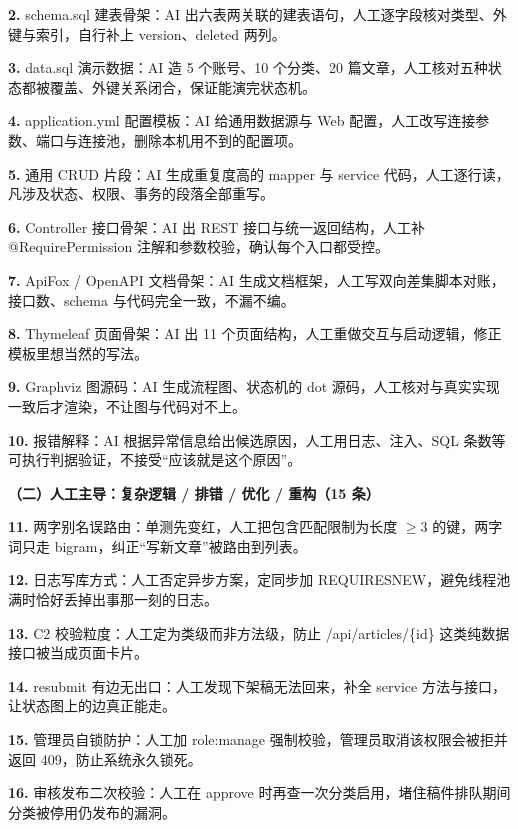 \documentclass[zihao=-4,UTF8,openany]{ctexart}
\renewcommand{\_}{\textunderscore\allowbreak}
\begin{document}
\noindent\textbf{2.} schema.sql 建表骨架：AI 出六表两关联的建表语句，人工逐字段核对类型、外键与索引，自行补上 version、deleted 两列。

\noindent\textbf{3.} data.sql 演示数据：AI 造 5 个账号、10 个分类、20 篇文章，人工核对五种状态都被覆盖、外键关系闭合，保证能演完状态机。

\noindent\textbf{4.} application.yml 配置模板：AI 给通用数据源与 Web 配置，人工改写连接参数、端口与连接池，删除本机用不到的配置项。

\noindent\textbf{5.} 通用 CRUD 片段：AI 生成重复度高的 mapper 与 service 代码，人工逐行读，凡涉及状态、权限、事务的段落全部重写。

\noindent\textbf{6.} Controller 接口骨架：AI 出 REST 接口与统一返回结构，人工补 @RequirePermission 注解和参数校验，确认每个入口都受控。

\noindent\textbf{7.} ApiFox / OpenAPI 文档骨架：AI 生成文档框架，人工写双向差集脚本对账，接口数、schema 与代码完全一致，不漏不编。

\noindent\textbf{8.} Thymeleaf 页面骨架：AI 出 11 个页面结构，人工重做交互与启动逻辑，修正模板里想当然的写法。

\noindent\textbf{9.} Graphviz 图源码：AI 生成流程图、状态机的 dot 源码，人工核对与真实实现一致后才渲染，不让图与代码对不上。

\noindent\textbf{10.} 报错解释：AI 根据异常信息给出候选原因，人工用日志、注入、SQL 条数等可执行判据验证，不接受“应该就是这个原因”。

\noindent\textbf{（二）人工主导：复杂逻辑 / 排错 / 优化 / 重构（15 条）}

\noindent\textbf{11.} 两字别名误路由：单测先变红，人工把包含匹配限制为长度 $\geq 3$ 的键，两字词只走 bigram，纠正“写新文章”被路由到列表。

\noindent\textbf{12.} 日志写库方式：人工否定异步方案，定同步加 REQUIRES\_NEW，避免线程池满时恰好丢掉出事那一刻的日志。

\noindent\textbf{13.} C2 校验粒度：人工定为类级而非方法级，防止 /api/articles/\{id\} 这类纯数据接口被当成页面卡片。

\noindent\textbf{14.} resubmit 有边无出口：人工发现下架稿无法回来，补全 service 方法与接口，让状态图上的边真正能走。

\noindent\textbf{15.} 管理员自锁防护：人工加 role:manage 强制校验，管理员取消该权限会被拒并返回 409，防止系统永久锁死。

\noindent\textbf{16.} 审核发布二次校验：人工在 approve 时再查一次分类启用，堵住稿件排队期间分类被停用仍发布的漏洞。
\end{document}
